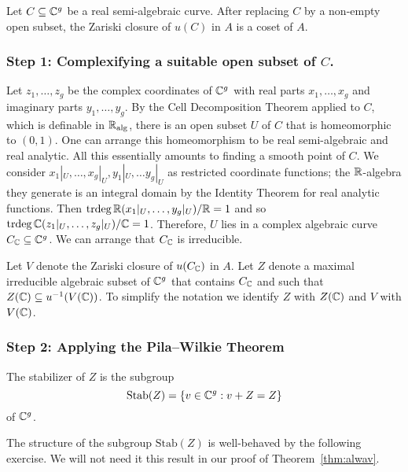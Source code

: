 \begin{theorem}
  \label{thm:alwav}
  Let $C\subseteq{\mathbb{C}}^g$ be a real semi-algebraic curve. After replacing
  $C$ by a non-empty open subset, the Zariski
  closure of $u(C)$ in $A$ is a coset of $A$.
\end{theorem}

\subsubsection{Step 1: Complexifying a suitable open subset of $C$.}

Let $z_1,\ldots,z_g$ be the complex coordinates of ${\mathbb{C}}^g$ with real
parts $x_1,\ldots,x_g$ and imaginary parts $y_1,\ldots,y_g$. By the
Cell Decomposition Theorem applied to $C$, which is definable in
${\mathbb{R}}_{\mathrm{alg}}$, there is an open subset $U$ of $C$ that is homeomorphic to
$(0,1)$. One can arrange this homeomorphism to be real semi-algebraic
and real analytic. All this essentially amounts to finding a smooth
point of $C$. We consider $x_1|_{U},\ldots,{x_g}|_U,{y_1}|_U,\ldots
y_g|_{U}$ as restricted coordinate functions; the ${\mathbb{R}}$-algebra they
generate is an integral domain by the Identity Theorem for real
analytic functions. Then
$\mathrm{trdeg}\,{\mathbb{R}}({x_1}|_U,\ldots,{y_g}|_U)/{\mathbb{R}}=1$ and so
$\mathrm{trdeg}\,{\mathbb{C}}({z_1}|_U,\ldots,{z_g}|_U)/{\mathbb{C}}=1$. Therefore, $U$
lies in a complex algebraic curve $C_{{\mathbb{C}}}\subseteq{\mathbb{C}}^g$. We can
arrange that $C_{\mathbb{C}}$ is irreducible.

Let $V$ denote the Zariski closure of $u(C_{\mathbb{C}})$ in $A$. Let $Z$
denote a maximal irreducible algebraic subset of ${\mathbb{C}}^g$ that contains $C_{{\mathbb{C}}}$
and such that $Z({\mathbb{C}})\subseteq u^{-1}(V({\mathbb{C}}))$. To
simplify the notation we identify $Z$ with $Z({\mathbb{C}})$ and $V$ with
$V({\mathbb{C}})$.


\subsubsection{Step 2: Applying the Pila--Wilkie Theorem}


\begin{definition}
  \label{def:stabZ}
  The stabilizer of $Z$ is the subgroup
  \begin{equation*}
    \mathrm{Stab}(Z) = \{v\in {\mathbb{C}}^g : v+Z=Z\}
  \end{equation*}
  of ${\mathbb{C}}^g$. 
\end{definition}

The structure of the subgroup $\mathrm{Stab}(Z)$ is well-behaved by
the following exercise. We will not need it this result in our proof
of Theorem~\ref{thm:alwav}.

